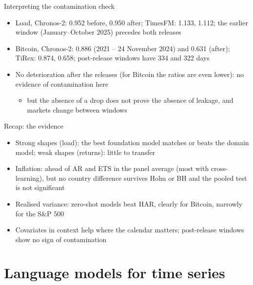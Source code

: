 \begin{frame}{Interpreting the contamination check}
\itemsize{\small}
\begin{itemize}
    \item Load, Chronos-2: 0.952 before, 0.950 after; TimesFM: 1.133, 1.112; the earlier window (January--October 2025) precedes both releases
    \item Bitcoin, Chronos-2: 0.886 (2021 -- 24 November 2024) and 0.631 (after); TiRex: 0.874, 0.658; post-release windows have 334 and 322 days
    \item No deterioration after the releases (for Bitcoin the ratios are even lower): no evidence of contamination here
    \begin{itemize}
        \item but the absence of a drop does not prove the absence of leakage, and markets change between windows
    \end{itemize}
\end{itemize}
\end{frame}

\begin{frame}{Recap: the evidence}
\itemsize{\small}
\begin{itemize}
    \item Strong shapes (load): the best foundation model matches or beats the domain model; weak shapes (returns): little to transfer
    \item Inflation: ahead of AR and ETS in the panel average (most with cross-learning), but no country difference survives Holm or BH and the pooled test is not significant
    \item Realised variance: zero-shot models beat HAR, clearly for Bitcoin, narrowly for the S\&P 500
    \item Covariates in context help where the calendar matters; post-release windows show no sign of contamination
\end{itemize}
\end{frame}


\section{Language models for time series}

